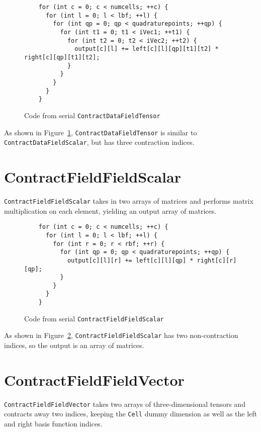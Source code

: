\begin{figure}[ht]
    \begin{lstlisting}
    for (int c = 0; c < numcells; ++c) {
      for (int l = 0; l < lbf; ++l) {
        for (int qp = 0; qp < quadraturepoints; ++qp) {
          for (int t1 = 0; t1 < iVec1; ++t1) {
            for (int t2 = 0; t2 < iVec2; ++t2) {
              output[c][l] += left[c][l][qp][t1][t2] * right[c][qp][t1][t2];
            }
          }
        }
      }
    }
    \end{lstlisting}
\caption{Code from serial \texttt{ContractDataFieldTensor}
\label{lst:ContractDataFieldTensorSerial}} 
\end{figure}

As shown in Figure~\ref{lst:ContractDataFieldTensorSerial},
\texttt{ContractDataFieldTensor} is similar to \texttt{ContractDataFieldScalar},
but has three contraction indices. 

\section{ContractFieldFieldScalar}
\texttt{ContractFieldFieldScalar} takes in two arrays of matrices and performs
matrix multiplication on each element, yielding an output array of matrices.

\begin{figure}[ht]
    \begin{lstlisting}
    for (int c = 0; c < numcells; ++c) {
      for (int l = 0; l < lbf; ++l) {
        for (int r = 0; r < rbf; ++r) {
          for (int qp = 0; qp < quadraturepoints; ++qp) {
            output[c][l][r] += left[c][l][qp] * right[c][r][qp];
          }
        }
      }
    }
    \end{lstlisting}
\caption{Code from serial \texttt{ContractFieldFieldScalar}
\label{lst:ContractFieldFieldScalarSerial}} 
\end{figure}

As shown in Figure~\ref{lst:ContractFieldFieldScalarSerial},
\texttt{ContractFieldFieldScalar} has two non-contraction indices, so the output
is an array of matrices.

\section{ContractFieldFieldVector}
\texttt{ContractFieldFieldVector} takes two arrays of three-dimensional tensors
and contracts away two indices, keeping the \texttt{Cell} dummy dimension as
well as the left and right basis function indices.

